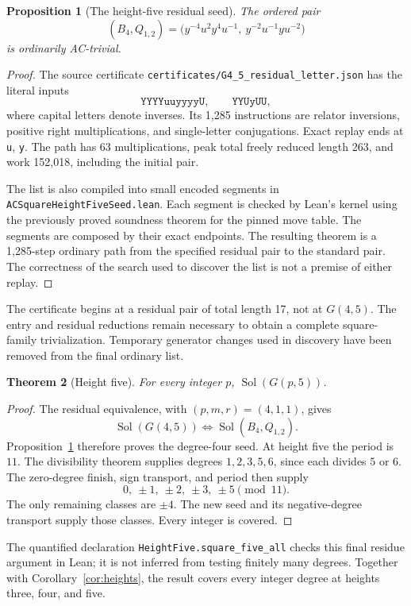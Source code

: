 \documentclass[11pt]{article}
\newtheorem{theorem}{Theorem}[section]
\newtheorem{proposition}[theorem]{Proposition}
\theoremstyle{definition}\newtheorem{definition}[theorem]{Definition}
\theoremstyle{remark}\newtheorem{remark}[theorem]{Remark}
\newcommand{\Sol}{\operatorname{Sol}}
\begin{document}
\begin{proposition}[The height-five residual seed]\label{prop:h5seed}
The ordered pair
\[
(B_4,Q_{1,2})=
\bigl(y^{-4}u^2y^4u^{-1},\ y^{-2}u^{-1}yu^{-2}\bigr)
\]
is ordinarily AC-trivial.
\end{proposition}
\begin{proof}
The source certificate \texttt{certificates/G4\_5\_residual\_letter.json} has the literal inputs
\[
\texttt{YYYYuuyyyyU},\qquad\texttt{YYUyUU},
\]
where capital letters denote inverses. Its 1,285 instructions are relator inversions, positive right multiplications, and single-letter conjugations. Exact replay ends at \texttt{u}, \texttt{y}. The path has 63 multiplications, peak total freely reduced length 263, and work 152,018, including the initial pair.

The list is also compiled into small encoded segments in \texttt{ACSquareHeightFiveSeed.lean}. Each segment is checked by Lean's kernel using the previously proved soundness theorem for the pinned move table. The segments are composed by their exact endpoints. The resulting theorem is a 1,285-step ordinary path from the specified residual pair to the standard pair. The correctness of the search used to discover the list is not a premise of either replay.
\end{proof}

The certificate begins at a residual pair of total length 17, not at $G(4,5)$. The entry and residual reductions remain necessary to obtain a complete square-family trivialization. Temporary generator changes used in discovery have been removed from the final ordinary list.

\begin{theorem}[Height five]\label{thm:h5}
For every integer $p$, $\Sol(G(p,5))$.
\end{theorem}
\begin{proof}
The residual equivalence, with $(p,m,r)=(4,1,1)$, gives
\[
\Sol(G(4,5))\iff\Sol(B_4,Q_{1,2}).
\]
Proposition~\ref{prop:h5seed} therefore proves the degree-four seed. At height five the period is $11$. The divisibility theorem supplies degrees $1,2,3,5,6$, since each divides $5$ or $6$. The zero-degree finish, sign transport, and period then supply
\[
0,\ \pm1,\ \pm2,\ \pm3,\ \pm5\pmod{11}.
\]
The only remaining classes are $\pm4$. The new seed and its negative-degree transport supply those classes. Every integer is covered.
\end{proof}

The quantified declaration \texttt{HeightFive.square\_five\_all} checks this final residue argument in Lean; it is not inferred from testing finitely many degrees. Together with Corollary~\ref{cor:heights}, the result covers every integer degree at heights three, four, and five.
\end{document}
